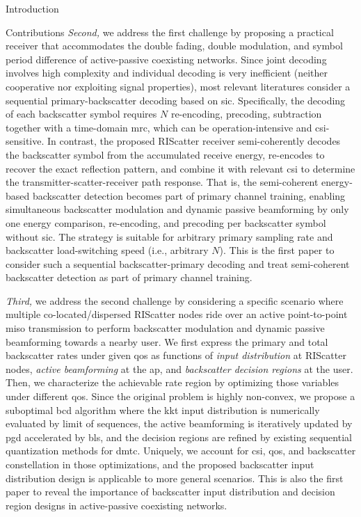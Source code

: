 \documentclass[journal]{IEEEtran}
\begin{document}
\begin{section}{Introduction}
\begin{subsection}{Contributions}
		\emph{Second,} we address the first challenge by proposing a practical receiver that accommodates the double fading, double modulation, and symbol period difference of active-passive coexisting networks.
		Since joint decoding involves high complexity and individual decoding is very inefficient (neither cooperative nor exploiting signal properties), most relevant literatures consider a sequential primary-backscatter decoding based on \gls{sic}.
		Specifically, the decoding of each backscatter symbol requires $N$ re-encoding, precoding, subtraction together with a time-domain \gls{mrc}, which can be operation-intensive and \gls{csi}-sensitive.
		In contrast, the proposed RIScatter receiver semi-coherently decodes the backscatter symbol from the accumulated receive energy, re-encodes to recover the exact reflection pattern, and combine it with relevant \gls{csi} to determine the transmitter-scatter-receiver path response.
		That is, the semi-coherent energy-based backscatter detection becomes part of primary channel training, enabling simultaneous backscatter modulation and dynamic passive beamforming by only one energy comparison, re-encoding, and precoding per backscatter symbol without \gls{sic}.
		The strategy is suitable for arbitrary primary sampling rate and backscatter load-switching speed (i.e., arbitrary $N$).
		This is the first paper to consider such a sequential backscatter-primary decoding and treat semi-coherent backscatter detection as part of primary channel training.

		\emph{Third,} we address the second challenge by considering a specific scenario where multiple co-located/dispersed RIScatter nodes ride over an active point-to-point \gls{miso} transmission to perform backscatter modulation and dynamic passive beamforming towards a nearby user.
		We first express the primary and total backscatter rates under given \gls{qos} as functions of \emph{input distribution} at RIScatter nodes, \emph{active beamforming} at the \gls{ap}, and \emph{backscatter decision regions} at the user.
		Then, we characterize the achievable rate region by optimizing those variables under different \gls{qos}.
		Since the original problem is highly non-convex, we propose a suboptimal \gls{bcd} algorithm where the \gls{kkt} input distribution is numerically evaluated by limit of sequences, the active beamforming is iteratively updated by \gls{pgd} accelerated by \gls{bls}, and the decision regions are refined by existing sequential quantization methods for \gls{dmtc}.
		Uniquely, we account for \gls{csi}, \gls{qos}, and backscatter constellation in those optimizations, and the proposed backscatter input distribution design is applicable to more general scenarios.
		This is also the first paper to reveal the importance of backscatter input distribution and decision region designs in active-passive coexisting networks.


\end{subsection}
\end{section}
\end{document}
